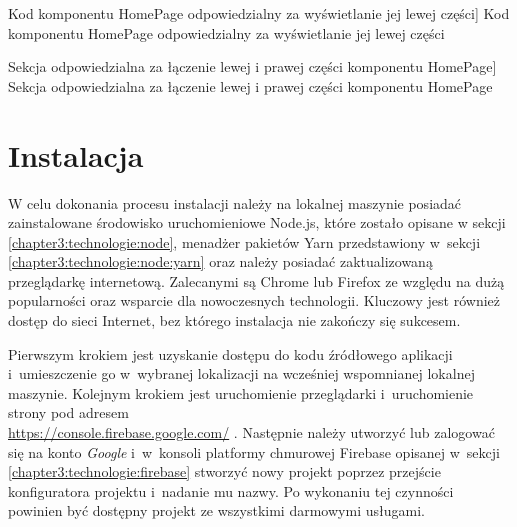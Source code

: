 \documentclass[../Kamil_Kowalewski_Main.tex]{subfiles}
\begin{document}
{{{            \begin{code}[H]
                
                \caption
                [Kod komponentu HomePage odpowiedzialny za wyświetlanie jej lewej części]
                {Kod komponentu HomePage odpowiedzialny za wyświetlanie jej lewej części}
                \label{chapter4:dok_techniczna:implementacja:responsywnosc:rwd_home_page_left_side}
            \end{code}

            \begin{code}[H]
                
                \caption
                [Sekcja odpowiedzialna za łączenie lewej i prawej części komponentu HomePage]
                {Sekcja odpowiedzialna za łączenie lewej i prawej części komponentu HomePage}
                \label{chapter4:dok_techniczna:implementacja:responsywnosc:rwd_home_page_return_section}
            \end{code}
        }
    }

    \section{Instalacja}
    \label{chapter4:dok_techniczna:instalacja} {
        W celu dokonania procesu instalacji należy na lokalnej maszynie posiadać
        zainstalowane środowisko uruchomieniowe Node.js, które zostało opisane w sekcji
        \ref{chapter3:technologie:node}, menadżer pakietów Yarn przedstawiony w~sekcji
        \ref{chapter3:technologie:node:yarn} oraz należy posiadać zaktualizowaną
        przeglądarkę internetową. Zalecanymi są Chrome\cite{website:chrome} lub
        Firefox\cite{website:firefox} ze względu na dużą popularności oraz wsparcie
        dla nowoczesnych technologii. Kluczowy jest również dostęp do sieci Internet,
        bez którego instalacja nie zakończy się sukcesem.

        Pierwszym krokiem jest uzyskanie dostępu do kodu źródłowego aplikacji
        i~umieszczenie go w~wybranej lokalizacji na wcześniej wspomnianej lokalnej
        maszynie. Kolejnym krokiem jest uruchomienie przeglądarki i~uruchomienie strony
        pod adresem \\ \url{https://console.firebase.google.com/} . Następnie należy
        utworzyć lub zalogować się na konto \textit{Google} i~w~konsoli platformy
        chmurowej Firebase opisanej w~sekcji \ref{chapter3:technologie:firebase}
        stworzyć nowy projekt poprzez przejście konfiguratora projektu i~nadanie mu
        nazwy. Po wykonaniu tej czynności powinien być dostępny projekt ze wszystkimi
        darmowymi usługami.

}}
\end{document}
